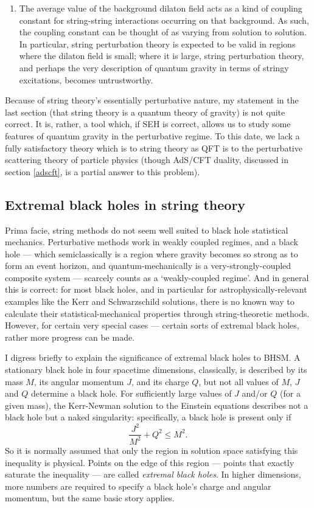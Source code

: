 \documentclass[12pt]{article}
\newcommand{\be}{\begin{equation}}
\newcommand{\ee}{\end{equation}}
\begin{document}
\begin{enumerate}
\item The average value of the background dilaton field acts as a kind of coupling constant for string-string interactions occurring on that background. As such, the coupling constant can be thought of as varying from solution to solution. In particular, string perturbation theory is expected to be valid in regions where the dilaton field is small; where it is large, string perturbation theory, and perhaps the very description of quantum gravity in terms of stringy excitations, becomes untrustworthy.
\end{enumerate}
Because of string theory's essentially perturbative nature, my statement in the last section (that string theory is a quantum theory of gravity) is not quite correct. It is, rather, a tool which, if SEH is correct, allows us to study some features of quantum gravity in the perturbative regime. To this date, we lack a fully satisfactory theory which is to string theory as QFT is to the perturbative scattering theory of particle physics (though AdS/CFT duality, discussed in section \ref{adscft}, is a partial answer to this problem).

\subsection{Extremal black holes in string theory}\label{string-extremal}

Prima facie, string methods do not seem well suited to black hole statistical mechanics. Perturbative methods work in weakly coupled regimes, and a black hole --- which semiclassically is a region where gravity becomes so strong as to form an event horizon, and quantum-mechanically is a very-strongly-coupled composite system --- scarcely counts as a `weakly-coupled regime'. And in general this is correct: for most black holes, and in particular for astrophysically-relevant examples like the Kerr and Schwarzschild solutions, there is no known way to calculate their statistical-mechanical properties through string-theoretic methods. However, for certain very special cases --- certain sorts of extremal black holes, rather more progress can be made.

I digress briefly to explain the significance of extremal black holes to BHSM. A stationary black hole in four spacetime dimensions, classically, is described by its mass $M$, its angular momentum $J$, and its charge $Q$, but not all values of $M$, $J$ and $Q$ determine a black hole. For sufficiently large values of $J$ and/or $Q$ (for a given mass), the Kerr-Newman solution to the Einstein equations describes not a black hole but a naked singularity: specifically, a black hole is present only if
\be
\frac{J^2}{M^2} + Q^2 \leq M^2.
\ee
 So it is normally assumed that only the region in solution space satisfying this inequality is physical. Points on the edge of this region --- points that exactly saturate the inequality --- are called \emph{extremal black holes}. In higher dimensions, more numbers are required to specify a black hole's charge and angular momentum, but the same basic story applies.
 
\end{document}
